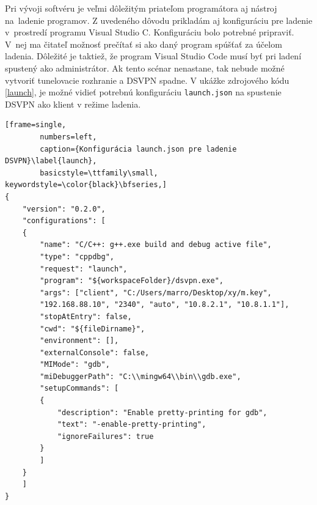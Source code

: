 Pri vývoji softvéru je veľmi dôležitým priateľom programátora aj nástroj na~ladenie programov. Z uvedeného dôvodu prikladám aj konfiguráciu pre ladenie v~prostredí programu Visual Studio C. Konfiguráciu bolo potrebné pripraviť. V~nej ma čitateľ možnosť prečítať si ako daný program spúšťať za účelom ladenia. Dôležité je taktiež, že program Visual Studio Code musí byť pri ladení spustený ako administrátor. Ak tento scénar nenastane, tak nebude možné vytvoriť tunelovacie rozhranie a DSVPN spadne. V ukážke zdrojového kódu \ref{launch}, je možné vidieť potrebnú konfiguráciu \lstinline|launch.json| na spustenie DSVPN ako klient v režime ladenia. 

\begin{minipage}{\linewidth} 	
	\begin{lstlisting}[frame=single,
		numbers=left,
		caption={Konfigurácia launch.json pre ladenie DSVPN}\label{launch},
		basicstyle=\ttfamily\small, keywordstyle=\color{black}\bfseries,]
{
	"version": "0.2.0",
	"configurations": [
	{
		"name": "C/C++: g++.exe build and debug active file",
		"type": "cppdbg",
		"request": "launch",
		"program": "${workspaceFolder}/dsvpn.exe",
		"args": ["client", "C:/Users/marro/Desktop/xy/m.key", 
		"192.168.88.10", "2340", "auto", "10.8.2.1", "10.8.1.1"],
		"stopAtEntry": false,
		"cwd": "${fileDirname}",
		"environment": [],
		"externalConsole": false,
		"MIMode": "gdb",
		"miDebuggerPath": "C:\\mingw64\\bin\\gdb.exe",
		"setupCommands": [
		{
			"description": "Enable pretty-printing for gdb",
			"text": "-enable-pretty-printing",
			"ignoreFailures": true
		}
		]
	}
	]
}
	\end{lstlisting}
\end{minipage}\\